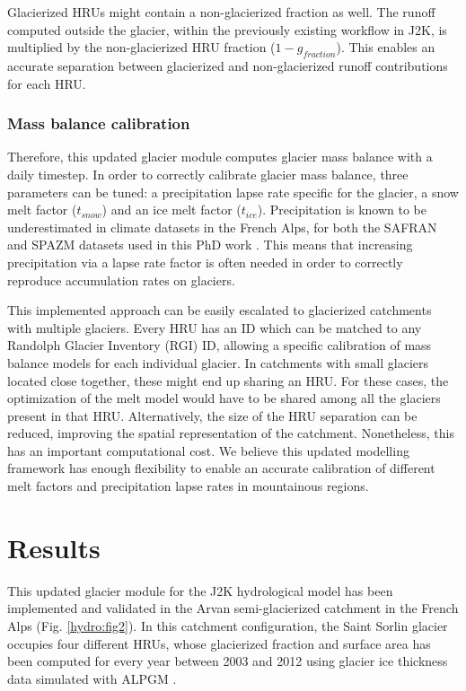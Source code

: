 Glacierized HRUs might contain a non-glacierized fraction as well. The runoff computed outside the glacier, within the previously existing workflow in J2K, is multiplied by the non-glacierized HRU fraction ($1 - g_{fraction}$). This enables an accurate separation between glacierized and non-glacierized runoff contributions for each HRU. 

\subsubsection{Mass balance calibration}

Therefore, this updated glacier module computes glacier mass balance with a daily timestep. In order to correctly calibrate glacier mass balance, three parameters can be tuned: a precipitation lapse rate specific for the glacier, a snow melt factor ($t_{snow}$) and an ice melt factor ($t_{ice}$). Precipitation is known to be underestimated in climate datasets in the French Alps, for both the SAFRAN and SPAZM datasets used in this PhD work \citep{vionnet_numerical_2016}. This means that increasing precipitation via a lapse rate factor is often needed in order to correctly reproduce accumulation rates on glaciers. 

This implemented approach can be easily escalated to glacierized catchments with multiple glaciers. Every HRU has an ID which can be matched to any Randolph Glacier Inventory (RGI) ID, allowing a specific calibration of mass balance models for each individual glacier. In catchments with small glaciers located close together, these might end up sharing an HRU. For these cases, the optimization of the melt model would have to be shared among all the glaciers present in that HRU. Alternatively, the size of the HRU separation can be reduced, improving the spatial representation of the catchment. Nonetheless, this has an important computational cost. We believe this updated modelling framework has enough flexibility to enable an accurate calibration of different melt factors and precipitation lapse rates in mountainous regions. 

\section{Results}

This updated glacier module for the J2K hydrological model has been implemented and validated in the Arvan semi-glacierized catchment in the French Alps (Fig. \ref{hydro:fig2}). In this catchment configuration, the Saint Sorlin glacier occupies four different HRUs, whose glacierized fraction and surface area has been computed for every year between 2003 and 2012 using glacier ice thickness data simulated with ALPGM \citep{bolibar_alpgm_2020}.


